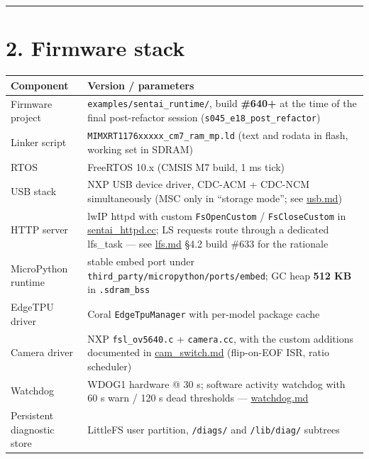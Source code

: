 \begin{center}\rule{0.5\linewidth}{0.5pt}\end{center}

\section{2. Firmware stack}\label{firmware-stack}

{\def\LTcaptype{none} %
\begin{longtable}[]{@{}
  >{\raggedright\arraybackslash}p{}
  >{\raggedright\arraybackslash}p{}@{}}
\toprule\noalign{}
\begin{minipage}[b]{\linewidth}\raggedright
Component
\end{minipage} & \begin{minipage}[b]{\linewidth}\raggedright
Version / parameters
\end{minipage} \\
\midrule\noalign{}
\endhead
\bottomrule\noalign{}
\endlastfoot
Firmware project & \texttt{examples/sentai\_runtime/}, build
\textbf{\#640+} at the time of the final post-refactor session
(\texttt{s045\_e18\_post\_refactor}) \\
Linker script & \texttt{MIMXRT1176xxxxx\_cm7\_ram\_mp.ld} (text and
rodata in flash, working set in SDRAM) \\
RTOS & FreeRTOS 10.x (CMSIS M7 build, 1 ms tick) \\
USB stack & NXP USB device driver, CDC-ACM + CDC-NCM simultaneously (MSC
only in ``storage mode''; see \url{usb.md}) \\
HTTP server & lwIP httpd with custom \texttt{FsOpenCustom} /
\texttt{FsCloseCustom} in \href{../sentai_httpd.cc}{sentai\_httpd.cc};
LS requests route through a dedicated lfs\_task --- see \url{lfs.md}
§4.2 build \#633 for the rationale \\
MicroPython runtime & stable embed port under
\texttt{third\_party/micropython/ports/embed}; GC heap \textbf{512 KB}
in \texttt{.sdram\_bss} \\
EdgeTPU driver & Coral \texttt{EdgeTpuManager} with per-model package
cache \\
Camera driver & NXP \texttt{fsl\_ov5640.c} + \texttt{camera.cc}, with
the custom additions documented in \url{cam_switch.md} (flip-on-EOF ISR,
ratio scheduler) \\
Watchdog & WDOG1 hardware @ 30 s; software activity watchdog with 60 s
warn / 120 s dead thresholds --- \url{watchdog.md} \\
Persistent diagnostic store & LittleFS user partition, \texttt{/diags/}
and \texttt{/lib/diag/} subtrees \\
\end{longtable}
}

